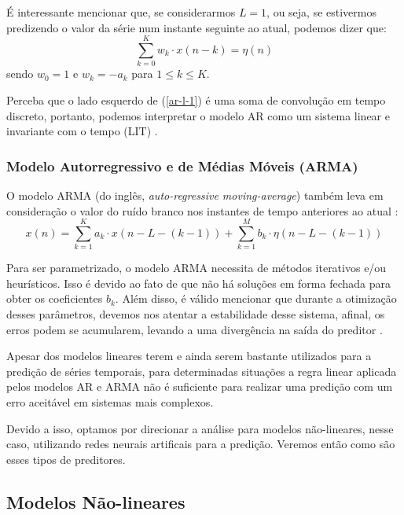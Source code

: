 \documentclass[a4paper, 12pt]{article}
\begin{document}
É interessante mencionar que, se considerarmos $L = 1$, ou seja, se estivermos predizendo o valor da série num instante seguinte ao atual, podemos dizer que:
\begin{equation}\label{ar-l-1}
\sum_{k=0}^{K} w_{k} \cdot x(n - k) = \eta (n)
\end{equation}
sendo $w_{0} = 1$ e $w_{k} = -a_{k}$ para $1 \leq k \leq K$.

Perceba que o lado esquerdo de (\ref{ar-l-1}) é uma soma de convolução em tempo discreto, portanto, podemos interpretar o modelo AR como um sistema linear e invariante com o tempo (LIT) \cite{haykin2008adaptive}.

\subsubsection{Modelo Autorregressivo e de Médias Móveis (ARMA)}

O modelo ARMA (do inglês, \textit{auto-regressive moving-average}) também leva em consideração o valor do ruído branco nos instantes de tempo anteriores ao atual \cite{box2015time}:
\begin{equation}
x(n) = \sum_{k = 1}^{K} a_{k} \cdot x(n - L - (k-1)) + \sum_{k=1}^{M} b_{k} \cdot \eta(n - L - (k-1))
\end{equation} 

Para ser parametrizado, o modelo ARMA necessita de métodos iterativos e/ou heurísticos. Isso é devido ao fato de que não há soluções em forma fechada para obter os coeficientes $b_k$. Além disso, é válido mencionar que durante a otimização desses parâmetros, devemos nos atentar a estabilidade desse sistema, afinal, os erros podem se acumularem, levando a uma divergência na saída do preditor \cite{box2015time}.

Apesar dos modelos lineares terem e ainda serem bastante utilizados para a predição de séries temporais, para determinadas situações a regra linear aplicada pelos modelos AR e ARMA não é suficiente para realizar uma predição com um erro aceitável em sistemas mais complexos. 

Devido a isso, optamos por direcionar a análise para modelos não-lineares, nesse caso, utilizando redes neurais artificais para a predição. Veremos então como são esses tipos de preditores.

\subsection{Modelos Não-lineares}
\end{document}

